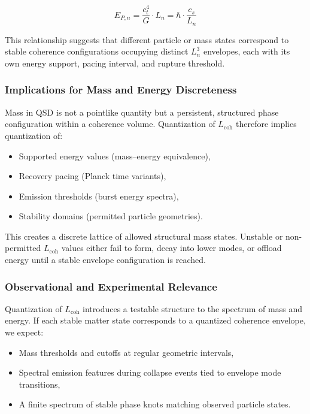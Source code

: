 \documentclass[entropy,article,submit,pdftex,moreauthors]{Definitions/mdpi}
\begin{document}
\begin{equation}
E_{P,n} = \frac{c_t^4}{G} \cdot L_n = \hbar \cdot \frac{c_s}{L_n}
\end{equation}

This relationship suggests that different particle or mass states correspond to stable coherence configurations occupying distinct $L_n^3$ envelopes, each with its own energy support, pacing interval, and rupture threshold.

\subsubsection{Implications for Mass and Energy Discreteness}

Mass in QSD is not a pointlike quantity but a persistent, structured phase configuration within a coherence volume. Quantization of $L_{\text{coh}}$ therefore implies quantization of:
\begin{itemize}
  \item Supported energy values (mass–energy equivalence),
  \item Recovery pacing (Planck time variants),
  \item Emission thresholds (burst energy spectra),
  \item Stability domains (permitted particle geometries).
\end{itemize}

This creates a discrete lattice of allowed structural mass states. Unstable or non-permitted $L_{\text{coh}}$ values either fail to form, decay into lower modes, or offload energy until a stable envelope configuration is reached.

\subsubsection{Observational and Experimental Relevance}

Quantization of $L_{\text{coh}}$ introduces a testable structure to the spectrum of mass and energy. If each stable matter state corresponds to a quantized coherence envelope, we expect:
\begin{itemize}
  \item Mass thresholds and cutoffs at regular geometric intervals,
  \item Spectral emission features during collapse events tied to envelope mode transitions,
  \item A finite spectrum of stable phase knots matching observed particle states.
\end{itemize}
\end{document}
